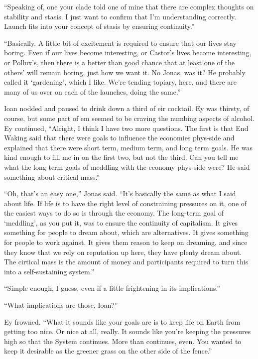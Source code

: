 ``Speaking of, one your clade told one of mine that there are complex thoughts on stability and stasis. I just want to confirm that I'm understanding correctly. Launch fits into your concept of stasis by ensuring continuity.''

``Basically. A little bit of excitement is required to ensure that our lives stay boring. Even if our lives become interesting, or Castor's lives become interesting, or Pollux's, then there is a better than good chance that at least one of the others' will remain boring, just how we want it. No Jonas, was it? He probably called it `gardening', which I like. We're tending topiary, here, and there are many of us over on each of the launches, doing the same.''

Ioan nodded and paused to drink down a third of eir cocktail. Ey was thirsty, of course, but some part of em seemed to be craving the numbing aspects of alcohol. Ey continued, ``Alright, I think I have two more questions. The first is that End Waking said that there were goals to influence the economies phys-side and explained that there were short term, medium term, and long term goals. He was kind enough to fill me in on the first two, but not the third. Can you tell me what the long term goals of meddling with the economy phys-side were? He said something about critical mass.''

``Oh, that's an easy one,'' Jonas said. ``It's basically the same as what I said about life. If life is to have the right level of constraining pressures on it, one of the easiest ways to do so is through the economy. The long-term goal of `meddling', as you put it, was to ensure the continuity of capitalism. It gives something for people to dream about, which are alternatives. It gives something for people to work against. It gives them reason to keep on dreaming, and since they know that we rely on reputation up here, they have plenty dream about. The cirtical mass is the amount of money and participants required to turn this into a self-sustaining system.''

``Simple enough, I guess, even if a little frightening in its implications.''

``What implications are those, Ioan?''

Ey frowned. ``What it sounds like your goals are is to keep life on Earth from getting too nice. Or nice at all, really. It sounds like you're keeping the pressures high so that the System continues. More than continues, even. You wanted to keep it desirable as the greener grass on the other side of the fence.''

